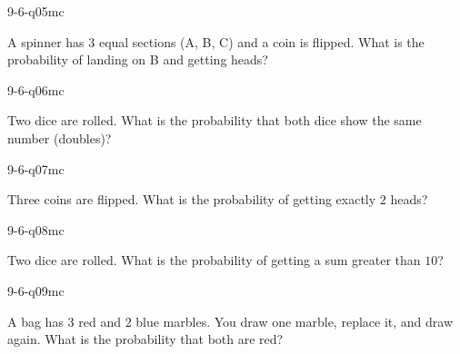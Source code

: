 \begin{practiceQuestion}{9-6-q05}{mc}
\begin{questionText}
A spinner has $3$ equal sections (A, B, C) and a coin is flipped. What is the probability of landing on B and getting heads?
\end{questionText}
\end{practiceQuestion}

\begin{practiceQuestion}{9-6-q06}{mc}
\begin{questionText}
Two dice are rolled. What is the probability that both dice show the same number (doubles)?
\end{questionText}
\end{practiceQuestion}

\begin{practiceQuestion}{9-6-q07}{mc}
\begin{questionText}
Three coins are flipped. What is the probability of getting exactly $2$ heads?
\end{questionText}
\end{practiceQuestion}

\begin{practiceQuestion}{9-6-q08}{mc}
\begin{questionText}
Two dice are rolled. What is the probability of getting a sum greater than $10$?
\end{questionText}
\end{practiceQuestion}

\begin{practiceQuestion}{9-6-q09}{mc}
\begin{questionText}
A bag has $3$ red and $2$ blue marbles. You draw one marble, replace it, and draw again. What is the probability that both are red?
\end{questionText}
\end{practiceQuestion}

